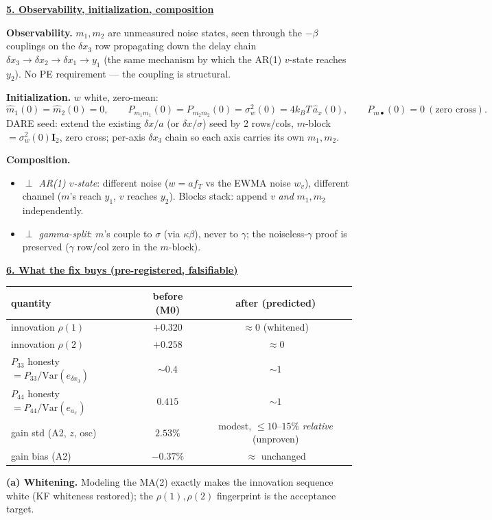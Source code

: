 \documentclass[11pt,a4paper,fontset=none]{ctexart}
\newcommand{\hd}[1]{\par\medskip\noindent\underline{\textbf{#1}}\par\nobreak\vspace{0.2ex}}
\newcommand{\sw}{\sigma^2_{w}}
\newcommand{\bet}{\beta}
\begin{document}
\hd{5. Observability, initialization, composition}
\textbf{Observability.} $m_1,m_2$ are unmeasured noise states, seen through the $-\bet$ couplings on the $\delta x_3$ row propagating down the delay chain $\delta x_3\!\to\!\delta x_2\!\to\!\delta x_1\!\to\!y_1$ (the same mechanism by which the AR(1) $v$-state reaches $y_2$). No PE requirement --- the coupling is structural.

\textbf{Initialization.} $w$ white, zero-mean:
\[ \hat m_1(0)=\hat m_2(0)=0,\qquad P_{m_1m_1}(0)=P_{m_2m_2}(0)=\sw(0)=4k_BT\,\hat a_x(0),\qquad P_{m\bullet}(0)=0\ (\text{zero cross}). \]
DARE seed: extend the existing $\delta x/a$ (or $\delta x/\sigma$) seed by 2 rows/cols, $m$-block $=\sw(0)\mathbf I_2$, zero cross; per-axis $\delta x_3$ chain so each axis carries its own $m_1,m_2$.

\textbf{Composition.}
\begin{itemize}[leftmargin=1.4em,topsep=2pt,itemsep=3pt]
\item \emph{$\perp$ AR(1) $v$-state}: different noise ($w=a f_T$ vs the EWMA noise $w_v$), different channel ($m$'s reach $y_1$, $v$ reaches $y_2$). Blocks stack: append $v$ \emph{and} $m_1,m_2$ independently.
\item \emph{$\perp$ gamma-split}: $m$'s couple to $\sigma$ (via $\kappa\bet$), never to $\gamma$; the noiseless-$\gamma$ proof is preserved ($\gamma$ row/col zero in the $m$-block).
\end{itemize}

\hd{6. What the fix buys (pre-registered, falsifiable)}
\begin{center}\small
\begin{tabular}{lcc}
\toprule
quantity & before (M0) & after (predicted) \\
\midrule
innovation $\rho(1)$ & $+0.320$ & $\approx 0$ (whitened) \\
innovation $\rho(2)$ & $+0.258$ & $\approx 0$ \\
$P_{33}$ honesty $=P_{33}/\mathrm{Var}(e_{\delta x_3})$ & ${\sim}0.4$ & ${\sim}1$ \\
$P_{44}$ honesty $=P_{44}/\mathrm{Var}(e_{a_x})$ & $0.415$ & ${\sim}1$ \\
gain std (A2, $z$, osc) & $2.53\%$ & modest, ${\le}10\text{--}15\%$ \emph{relative} (unproven) \\
gain bias (A2) & $-0.37\%$ & ${\approx}$ unchanged \\
\bottomrule
\end{tabular}
\end{center}
\textbf{(a) Whitening.} Modeling the MA(2) exactly makes the innovation sequence white (KF whiteness restored); the $\rho(1),\rho(2)$ fingerprint is the acceptance target.
\end{document}
